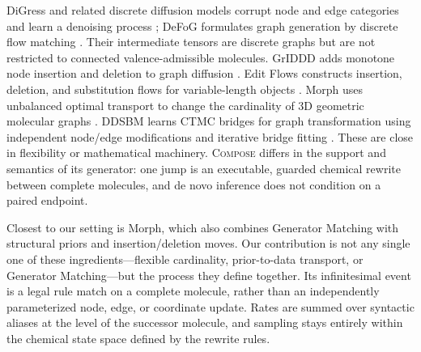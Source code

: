 \documentclass{article}
\newcommand{\method}{\textsc{Compose}\xspace}
\theoremstyle{definition}
\theoremstyle{remark}
\begin{document}
DiGress and related discrete diffusion models corrupt node and edge categories and learn a denoising process \citep{vignac2023digress,austin2021d3pm,campbell2022ctdd}; DeFoG formulates graph generation by discrete flow matching \citep{qin2025defog}. Their intermediate tensors are discrete graphs but are not restricted to connected valence-admissible molecules. GrIDDD adds monotone node insertion and deletion to graph diffusion \citep{ninniri2025griddd}. Edit Flows constructs insertion, deletion, and substitution flows for variable-length objects \citep{havasi2025editflows}. Morph uses unbalanced optimal transport to change the cardinality of 3D geometric molecular graphs \citep{franke2026morph}. DDSBM learns CTMC bridges for graph transformation using independent node/edge modifications and iterative bridge fitting \citep{kim2025ddsbm}. These are close in flexibility or mathematical machinery. \method differs in the support and semantics of its generator: one jump is an executable, guarded chemical rewrite between complete molecules, and de novo inference does not condition on a paired endpoint.

Closest to our setting is Morph, which also combines Generator Matching with structural priors and insertion/deletion moves. Our contribution is not any single one of these ingredients---flexible cardinality, prior-to-data transport, or Generator Matching---but the process they define together. Its infinitesimal event is a legal rule match on a complete molecule, rather than an independently parameterized node, edge, or coordinate update. Rates are summed over syntactic aliases at the level of the successor molecule, and sampling stays entirely within the chemical state space defined by the rewrite rules.
\end{document}
